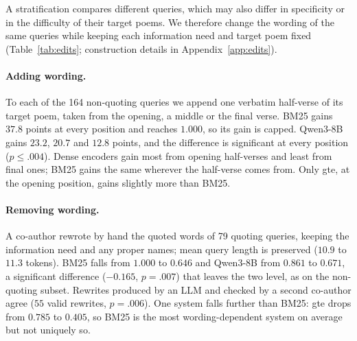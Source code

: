 \documentclass[11pt]{article}
\begin{document}
A stratification compares different queries, which may also differ in specificity or in the difficulty of their target poems. We therefore change the wording of the same queries while keeping each information need and target poem fixed (Table~\ref{tab:edits}; construction details in Appendix~\ref{app:edits}).

\paragraph{Adding wording.} To each of the 164 non-quoting queries we append one verbatim half-verse of its target poem, taken from the opening, a middle or the final verse. BM25 gains $37.8$ points at every position and reaches $1.000$, so its gain is capped. Qwen3-8B gains $23.2$, $20.7$ and $12.8$ points, and the difference is significant at every position ($p\leq.004$). Dense encoders gain most from opening half-verses and least from final ones; BM25 gains the same wherever the half-verse comes from. Only gte, at the opening position, gains slightly more than BM25.

\paragraph{Removing wording.} A co-author rewrote by hand the quoted words of 79 quoting queries, keeping the information need and any proper names; mean query length is preserved ($10.9$ to $11.3$ tokens). BM25 falls from $1.000$ to $0.646$ and Qwen3-8B from $0.861$ to $0.671$, a significant difference ($-0.165$, $p{=}.007$) that leaves the two level, as on the non-quoting subset. Rewrites produced by an LLM and checked by a second co-author agree ($55$ valid rewrites, $p{=}.006$). One system falls further than BM25: gte drops from $0.785$ to $0.405$, so BM25 is the most wording-dependent system on average but not uniquely so.

\begin{table}[t]
\centering\footnotesize
\setlength{\tabcolsep}{2.5pt}

\caption{Change in Recall@5 on \textit{Fann or Flop} when the same queries are edited. Left: one verbatim half-verse of the target poem appended to each non-quoting query, taken from the opening, a middle or the final verse. Right: the quoted words of the quoting queries rewritten by hand at equal length. Last row: BM25's change minus Qwen3-8B's (paired bootstrap; $^{**}p{<}.01$, $^{***}p{<}.001$).}
\label{tab:edits}
\end{table}
\end{document}
